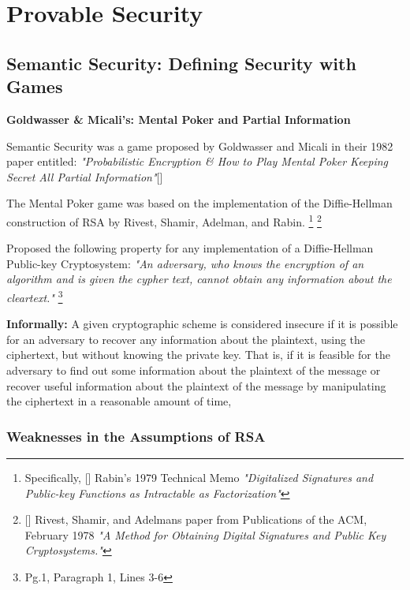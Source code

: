 \section{Provable Security} 


\subsection{Semantic Security: Defining Security with Games} 

\textbf{Goldwasser \& Micali's: Mental Poker and Partial Information} 
\bigskip

Semantic Security was a game proposed by Goldwasser and Micali in their 1982 paper entitled: \textit{"Probabilistic Encryption \& How to Play Mental Poker Keeping Secret All Partial Information"}[\cite{gol19820}]

The Mental Poker game was based on the implementation of the Diffie-Hellman construction of RSA by Rivest, Shamir, Adelman, and Rabin.
\footnote{Specifically, [\cite{rab19790}] Rabin's 1979 Technical Memo \textit{"Digitalized Signatures and Public-key Functions as Intractable as Factorization"}}
\footnote{[\cite{riv19780}] Rivest, Shamir, and Adelmans paper from Publications of the ACM, February 1978 \textit{"A Method for Obtaining Digital Signatures and Public Key Cryptosystems."}}
\medskip

\begin{defn}
 Proposed the following property for any implementation of a Diffie-Hellman Public-key Cryptosystem:  \textit{"An adversary, who knows the encryption of an algorithm and is given the cypher text, cannot obtain any information about the cleartext."} \footnote{\cite{gol1982} Pg.1, Paragraph 1, Lines 3-6} 
\end{defn}
\medskip

\textbf{Informally:}
\newline
A given cryptographic scheme is considered insecure if it is possible for an adversary to recover any information about the plaintext, using the ciphertext, but without knowing the private key. That is, if it is feasible for the adversary to find out some information about the plaintext of the message or recover useful information about the plaintext of the message by manipulating the ciphertext in a reasonable amount of time, 


\subsubsection{Weaknesses in the Assumptions of RSA} 
\medskip

